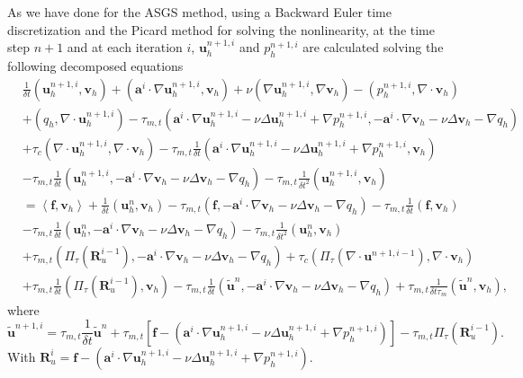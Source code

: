As we have done for the ASGS method, using a Backward Euler time discretization and the Picard method for solving the nonlinearity, at the time step $ n+1 $ and at each iteration $ i $, $ \mathbf{u}_h^{n+1,i} $ and $ p_h^{n+1,i} $ are calculated solving the following decomposed equations
\begin{align}
\label{14}
&\frac{1}{\delta t}(\mathbf{u}_h^{n+1,i},\mathbf{v}_h)+(\mathbf{a}^i\cdot\nabla\mathbf{u}_h^{n+1,i},\mathbf{v}_h)+\nu(\nabla\mathbf{u}_h^{n+1,i},\nabla\mathbf{v}_h)-(p_h^{n+1,i},\nabla\cdot\mathbf{v}_h)\\\nonumber
&+(q_h,\nabla\cdot\mathbf{u}_h^{n+1,i})-\tau_{m,t}(\mathbf{a}^i\cdot\nabla\mathbf{u}_h^{n+1,i}-\nu\Delta\mathbf{u}_h^{n+1,i}+\nabla p_h^{n+1,i},-\mathbf{a}^i\cdot\nabla\mathbf{v}_h-\nu\Delta\mathbf{v}_h-\nabla q_h)\\\nonumber
&+\tau_c(\nabla\cdot\mathbf{u}_h^{n+1,i},\nabla\cdot\mathbf{v}_h)-\tau_{m,t}\frac{1}{\delta t}(\mathbf{a}^i\cdot\nabla\mathbf{u}_h^{n+1,i}-\nu\Delta\mathbf{u}_h^{n+1,i}+\nabla p_h^{n+1,i},\mathbf{v}_h)\\\nonumber
&-\tau_{m,t}\frac{1}{\delta t}(\mathbf{u}_h^{n+1,i},-\mathbf{a}^i\cdot\nabla\mathbf{v}_h-\nu\Delta\mathbf{v}_h-\nabla q_h)-\tau_{m,t}\frac{1}{\delta t^2}(\mathbf{u}_h^{n+1,i},\mathbf{v}_h)\\\nonumber
&=\left<\mathbf{f},\mathbf{v}_h\right>+\frac{1}{\delta t}(\mathbf{u}_h^n,\mathbf{v}_h)-\tau_{m,t}(\mathbf{f},-\mathbf{a}^i\cdot\nabla\mathbf{v}_h-\nu\Delta\mathbf{v}_h-\nabla q_h)-\tau_{m,t}\frac{1}{\delta t}(\mathbf{f},\mathbf{v}_h)\\\nonumber
&-\tau_{m,t}\frac{1}{\delta t}(\mathbf{u}_h^n,-\mathbf{a}^i\cdot\nabla\mathbf{v}_h-\nu\Delta\mathbf{v}_h-\nabla q_h)-\tau_{m,t}\frac{1}{\delta t^2}(\mathbf{u}_h^n,\mathbf{v}_h)\\\nonumber
&+\tau_{m,t}(\Pi_\tau(\mathbf{R}_u^{i-1}),-\mathbf{a}^i\cdot\nabla\mathbf{v}_h-\nu\Delta\mathbf{v}_h-\nabla q_h)+\tau_c(\Pi_\tau(\nabla\cdot\mathbf{u}^{n+1,i-1}),\nabla\cdot\mathbf{v}_h)\\\nonumber
&+\tau_{m,t}\frac{1}{\delta t}(\Pi_\tau(\mathbf{R}_u^{i-1}),\mathbf{v}_h)-\tau_{m,t}\frac{1}{\delta t}(\tilde{\mathbf{u}}^n,-\mathbf{a}^i\cdot\nabla\mathbf{v}_h-\nu\Delta\mathbf{v}_h-\nabla q_h)+\tau_{m,t}\frac{1}{\delta t\tau_m}(\tilde{\mathbf{u}}^n,\mathbf{v}_h),
\end{align}
where
\begin{equation}
\label{15}
\tilde{\mathbf{u}}^{n+1,i}=\tau_{m,t}\frac{1}{\delta t}\tilde{\mathbf{u}}^n+\tau_{m,t}\left[\mathbf{f}-(\mathbf{a}^i\cdot\nabla\mathbf{u}_h^{n+1,i}-\nu\Delta\mathbf{u}_h^{n+1,i}+\nabla p_h^{n+1,i})\right]-\tau_{m,t}\Pi_\tau(\mathbf{R}_u^{i-1}).
\end{equation}
With $ \mathbf{R}_u^i=\mathbf{f}-(\mathbf{a}^i\cdot\nabla\mathbf{u}_h^{n+1,i}-\nu\Delta\mathbf{u}_h^{n+1,i}+\nabla p_h^{n+1,i})$.

